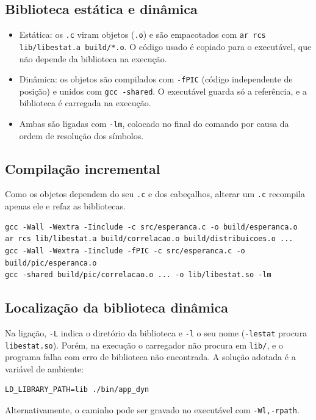 \documentclass[12pt,a4paper]{article}
\newcommand{\cod}[1]{\texttt{#1}}
\begin{document}
\subsection{Biblioteca estática e dinâmica}
\begin{itemize}[leftmargin=*]
  \item Estática: os \cod{.c} viram objetos (\cod{.o}) e são empacotados com
        \cod{ar rcs lib/libestat.a build/*.o}. O código usado é copiado para o
        executável, que não depende da biblioteca na execução.
  \item Dinâmica: os objetos são compilados com \cod{-fPIC} (código
        independente de posição) e unidos com \cod{gcc -shared}. O executável
        guarda só a referência, e a biblioteca é carregada na execução.
  \item Ambas são ligadas com \cod{-lm}, colocado no final do comando por causa
        da ordem de resolução dos símbolos.
\end{itemize}

\subsection{Compilação incremental}
Como os objetos dependem do seu \cod{.c} e dos cabeçalhos, alterar um
\cod{.c} recompila apenas ele e refaz as bibliotecas.
\begin{lstlisting}[style=shell]
gcc -Wall -Wextra -Iinclude -c src/esperanca.c -o build/esperanca.o
ar rcs lib/libestat.a build/correlacao.o build/distribuicoes.o ...
gcc -Wall -Wextra -Iinclude -fPIC -c src/esperanca.c -o build/pic/esperanca.o
gcc -shared build/pic/correlacao.o ... -o lib/libestat.so -lm
\end{lstlisting}

\subsection{Localização da biblioteca dinâmica}
Na ligação, \cod{-L} indica o diretório da biblioteca e \cod{-l} o seu nome
(\cod{-lestat} procura \cod{libestat.so}). Porém, na execução o carregador
não procura em \cod{lib/}, e o programa falha com erro de biblioteca não
encontrada. A solução adotada é a variável de ambiente:
\begin{lstlisting}[style=shell]
LD_LIBRARY_PATH=lib ./bin/app_dyn
\end{lstlisting}
Alternativamente, o caminho pode ser gravado no executável com
\cod{-Wl,-rpath}.

\end{document}
